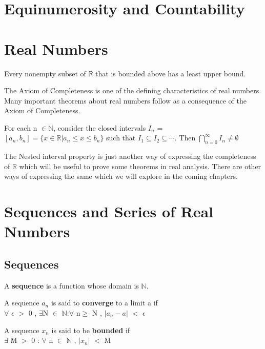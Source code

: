 \documentclass{report}
\begin{document}
\chapter{Equinumerosity and Countability}

\chapter{Real Numbers}
\begin{axiom}
Every nonempty subset of $\mathbb{R}$ that is bounded above has a least upper bound.
\end{axiom}
The Axiom of Completeness is one of the defining characteristics of real numbers. Many important theorems about real numbers follow as a consequence of the Axiom of Completeness.

\begin{theorem}
For each n $\in \mathbb{N}$, consider the closed intervals $I_n$ = $\left[a_n,b_n\right] = \{ x \in \mathbb{R}  \vert  a_n \leq x \leq b_n\}$ such that $I_1 \subseteq I_2 \subseteq \cdots$. Then $\bigcap^\infty_{n=0}I_n \neq \emptyset$
\end{theorem}
The Nested interval property is just another way of expressing the completeness of $\mathbb{R}$ which will be useful to prove some theorems in real analysis. There are other ways of expressing the same which we will explore in the coming chapters.

\chapter{Sequences and Series of Real Numbers}
\section{Sequences}

\begin{definition}
A \textbf{sequence} is a function whose domain is $\mathbb{N}$.
\end{definition}

\begin{definition}
A sequence $a_n $ is said to \textbf{converge} to a limit a if \\
$\forall$ $\epsilon$ $>$ 0 , $\exists$N $\in$ $\mathbb{N}$:$\forall$ n$\geq$ N , $\lvert a_n - a \rvert$ $<$ $\epsilon$
\end{definition}

\begin{definition}
A sequence $x_n$ is said to be \textbf{bounded} if \\
 $\exists$ M $>$ 0 : $\forall$ n $\in$ $\mathbb{N}$ , $\lvert x_n \rvert$ $<$ M
\end{definition}
\end{document}
